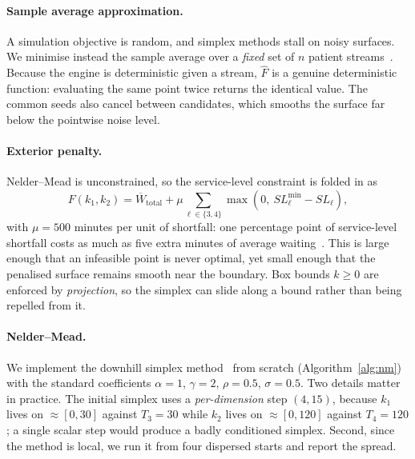 \documentclass[sigconf,nonacm]{acmart}
\begin{document}
\paragraph{Sample average approximation.}
A simulation objective is random, and simplex methods stall on noisy surfaces.
We minimise instead the sample average over a \emph{fixed} set of $n$ patient
streams~\cite{kim2015saa}. Because the engine is deterministic given a stream,
$\hat{F}$ is a genuine deterministic function: evaluating the same point twice
returns the identical value. The common seeds also cancel between candidates,
which smooths the surface far below the pointwise noise level.

\paragraph{Exterior penalty.}
Nelder--Mead is unconstrained, so the service-level constraint is folded in as
\begin{equation}
F(k_1,k_2) = \overline{W}_{\text{total}}
 + \mu \sum_{\ell\in\{3,4\}} \max\!\left(0,\ SL^{\min}_\ell - SL_\ell\right),
\label{eq:penalty}
\end{equation}
with $\mu = 500$ minutes per unit of shortfall: one percentage point of
service-level shortfall costs as much as five extra minutes of average
waiting~\cite{nocedal2006numerical}. This is large enough that an infeasible
point is never optimal, yet small enough that the penalised surface remains
smooth near the boundary. Box bounds $k\ge0$ are enforced by
\emph{projection}, so the simplex can slide along a bound rather than being
repelled from it.

\paragraph{Nelder--Mead.}
We implement the downhill simplex method~\cite{nelder1965simplex} from scratch
(Algorithm~\ref{alg:nm}) with the standard coefficients $\alpha=1$, $\gamma=2$,
$\rho=0.5$, $\sigma=0.5$. Two details matter in practice. The initial simplex
uses a \emph{per-dimension} step $(4,15)$, because $k_1$ lives on $\approx[0,30]$
against $T_3=30$ while $k_2$ lives on $\approx[0,120]$ against $T_4=120$; a
single scalar step would produce a badly conditioned simplex. Second, since the
method is local, we run it from four dispersed starts and report the spread.
\end{document}
